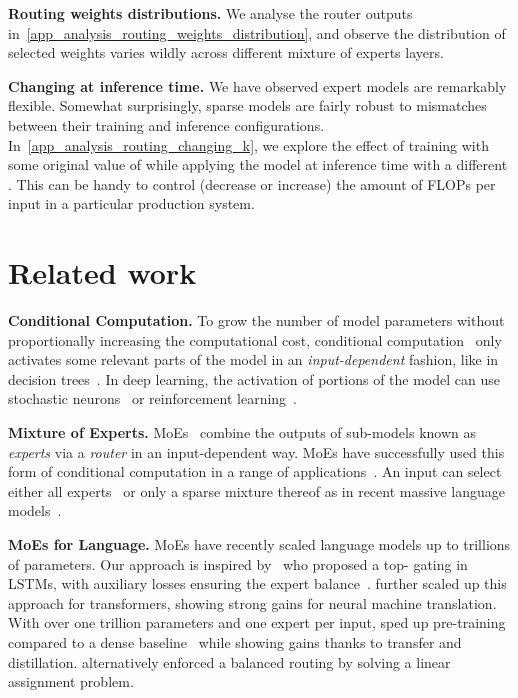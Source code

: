 \documentclass{article}
\begin{document}
\textbf{Routing weights distributions.}
We analyse the router outputs in~\cref{app_analysis_routing_weights_distribution}, and observe the distribution of selected weights varies wildly across different mixture of experts layers.

\textbf{Changing  at inference time.}
We have observed expert models are remarkably flexible.
Somewhat surprisingly, sparse models are fairly robust to mismatches between their training and inference configurations.
In~\cref{app_analysis_routing_changing_k}, we explore the effect of training with some original value of  while applying the model at inference time with a different .
This can be handy to control (decrease or increase) the amount of FLOPs per input in a particular production system. \section{Related work}

\textbf{Conditional Computation.} To grow the number of model parameters without proportionally increasing the computational cost, conditional computation~\cite{bengio2013deep,davis2013low,cho2014exponentially} only activates some relevant parts of the model in an \textit{input-dependent} fashion, like in decision trees~\cite{breiman1984classification}.
In deep learning,
the activation of portions of the model can use stochastic neurons~\cite{bengio2013estimating} or reinforcement learning~\cite{bengio2015conditional, denoyer2014deep, rosenbaum2017routing}.

\textbf{Mixture of Experts.} 
MoEs~\cite{jacobs1991adaptive, jordan1994hierarchical, chen1999improved, yuksel2012twenty} combine the outputs of sub-models known as \textit{experts} via a \textit{router} in an input-dependent way. MoEs have successfully used this form of conditional computation in a range of applications~\cite{gavrila2007multi, hu1997patient, tani1999learning, sminchisescu2004learning, zeevi1997time}. An input can select either all experts~\cite{eigen2013learning} or only a sparse mixture thereof as in recent massive language models~\cite{shazeer2017outrageously, lepikhin2020gshard, fedus2021switch}.

\textbf{MoEs for Language.}
MoEs have recently scaled language models up to trillions of parameters. 
Our approach is inspired by~\cite{shazeer2017outrageously} who proposed a top- gating in LSTMs, with auxiliary losses ensuring the expert balance~\cite{hansen1999combining}. \cite{lepikhin2020gshard} further scaled up this approach for transformers, showing strong gains for neural machine translation. With over one trillion parameters and one expert per input, \cite{fedus2021switch} sped up pre-training compared to a dense baseline~\cite{raffel2019exploring} while showing gains thanks to transfer and distillation. \cite{lewis2021base} alternatively enforced a balanced routing by solving a linear assignment problem.
\end{document}

